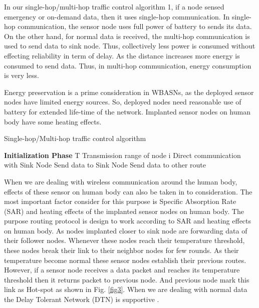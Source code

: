 \documentclass[journal]{IEEEtran}
\begin{document}
In our single-hop/multi-hop traffic control algorithm 1, if a node sensed emergency or on-demand data, then it uses single-hop communication. In single-hop communication, the sensor node uses full power of battery to sends its data. On the other hand, for normal data is received, the multi-hop communication is used to send data to sink node. Thus, collectively less power is consumed without effecting reliability in term of delay. As the distance increases more energy is consumed to send data. Thus, in multi-hop communication, energy consumption is very less.

Energy preservation is a prime consideration in WBASNs, as the deployed sensor nodes  have limited energy sources. So, deployed nodes need reasonable use of battery for extended life-time of the network. Implanted sensor nodes on human body have some heating effects.

\begin{algorithm}[H]
\caption{Single-hop/Multi-hop traffic control algorithm}
\begin{algorithmic}[1]
\STATE \textbf{Initialization Phase}
        \STATE T Transmission range of node i
         \STATE Direct communication with Sink Node
        \ELSE
         \STATE Send data to Sink Node
                   \STATE Send data to other route
                          \ENDIF
                             \ENDIF
\ENDIF
                             \ENDFOR
                          \end{algorithmic}
                           \end{algorithm}


 When we are dealing with wireless communication around the human body, effects of these sensor on human body can also be taken in to consideration. The most important factor consider for this purpose is Specific Absorption Rate (SAR) and heating effects of the implanted sensor nodes on human body. The purpose routing protocol is design to work according to SAR and heating effects on human body. As nodes implanted closer to sink node are forwarding data of their follower nodes. Whenever these nodes reach their temperature threshold, these nodes break their link to their neighbor nodes for few rounds. As their temperature become normal these sensor nodes establish their previous routes. However, if a sensor node receives a data packet and reaches its temperature threshold then it returns packet to previous node. And previous node mark this link as Hot-spot as shown in Fig.  \ref{fig3}. When we are dealing with normal data the Delay Tolerant Network (DTN) is supportive \cite{1}.
\end{document}

